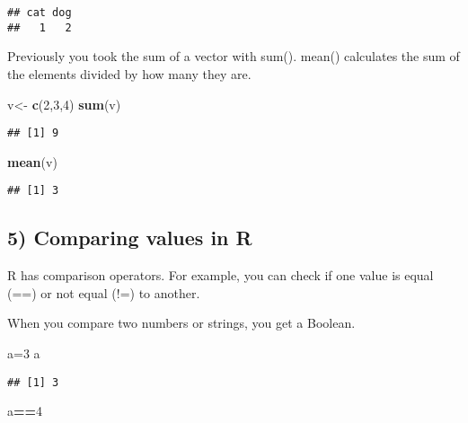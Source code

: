 \documentclass[
]{article}
\newenvironment{Shaded}{\begin{snugshade}}{\end{snugshade}}
\newcommand{\DecValTok}[1]{\textcolor[rgb]{0.00,0.00,0.81}{#1}}
\newcommand{\KeywordTok}[1]{\textcolor[rgb]{0.13,0.29,0.53}{\textbf{#1}}}
\newcommand{\NormalTok}[1]{#1}
\newcommand{\OperatorTok}[1]{\textcolor[rgb]{0.81,0.36,0.00}{\textbf{#1}}}
\newcommand{\StringTok}[1]{\textcolor[rgb]{0.31,0.60,0.02}{#1}}
\begin{document}
\begin{verbatim}
## cat dog 
##   1   2
\end{verbatim}

Previously you took the sum of a vector with sum(). mean() calculates
the sum of the elements divided by how many they are.

\begin{Shaded}
\begin{Highlighting}[]
\NormalTok{v<-}\StringTok{ }\KeywordTok{c}\NormalTok{(}\DecValTok{2}\NormalTok{,}\DecValTok{3}\NormalTok{,}\DecValTok{4}\NormalTok{)}
\KeywordTok{sum}\NormalTok{(v)}
\end{Highlighting}
\end{Shaded}

\begin{verbatim}
## [1] 9
\end{verbatim}

\begin{Shaded}
\begin{Highlighting}[]
\KeywordTok{mean}\NormalTok{(v)}
\end{Highlighting}
\end{Shaded}

\begin{verbatim}
## [1] 3
\end{verbatim}

\hypertarget{comparing-values-in-r}{%
\subsection{5) Comparing values in R}\label{comparing-values-in-r}}

R has comparison operators. For example, you can check if one value is
equal (==) or not equal (!=) to another.

When you compare two numbers or strings, you get a Boolean.

\begin{Shaded}
\begin{Highlighting}[]
\NormalTok{a=}\DecValTok{3}
\NormalTok{a}
\end{Highlighting}
\end{Shaded}

\begin{verbatim}
## [1] 3
\end{verbatim}

\begin{Shaded}
\begin{Highlighting}[]
\NormalTok{a}\OperatorTok{==}\DecValTok{4}
\end{Highlighting}
\end{Shaded}
\end{document}
